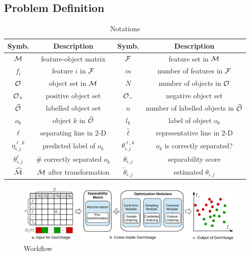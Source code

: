 \subsection{Problem Definition}\label{sec:prob}

\begin{table}[t!]
\centering
\small
\begin{tabular}{c|c|c|c}
   Symb. & Description & Symb. & Description\\
    \hline
    \hline
    $\mm$ & feature-object matrix & $\ff$ & feature set in $\mm$ \\
    \hline
    $f_i$ & feature $i$ in $\ff$ & $m$ & number of features in $\ff$\\
    \hline
    $\oo$ & object set in $\mm$ & $N$ & number of objects in $\oo$\\
    \hline
    $\oo_+$ & positive object set & $\oo_-$ & negative object set\\
    \hline
    $\widehat{\oo}$ & labelled object set & $n$ & number of labelled objects in $\widehat{\oo}$\\
    \hline
    $o_k$ & object $k$ in $\widehat{\oo}$ & $l_k$ & label of object $o_k$\\
    \hline
    $\ell$ & separating line in 2-D & $\hat{\ell}$ & representative line  in 2-D\\
    \hline
    $\eta_{i,j}^{\ell,k}$ & predicted label of $o_k$ & $\theta_{i,j}^{\ell,k}$ & $o_k$ is correctly separated? \\
    \hline
    $\theta_{i,j}^{\ell}$ & \# correctly separated $o_k$ & $\theta_{i,j}$ & separability score\\
    \hline
    $\widehat{\mm}$ & $\mm$ after transformation &  $\tilde{\theta}_{i,j}$ & estimated $\theta_{i,j}$\\
    \hline
 \end{tabular}
\caption{Notations}
\label{tbl:notation}
\vspace{-18pt}
\end{table}

\begin{figure}[t]
  \centering
  \includegraphics[width=0.9\linewidth]{fig/workflow2.pdf}
\caption{\genviz Workflow}
\label{fig:workflow}
\end{figure} 


